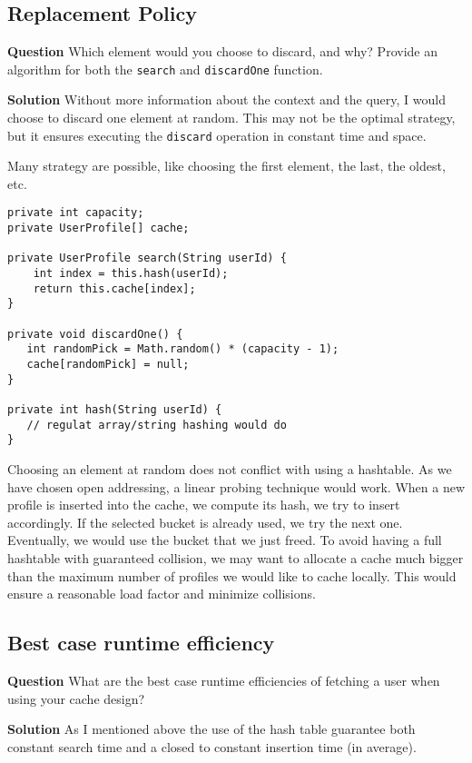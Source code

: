 \documentclass[11pt]{article}
\begin{document}
\subsection{Replacement Policy}
\label{sec:org84741a4}
\textbf{Question} Which element would you choose to discard, and why?
  Provide an algorithm for both the \texttt{search} and \texttt{discardOne}
  function.

\textbf{Solution} Without more information about the context and the
query, I would choose to discard one element at random. This may
not be the optimal strategy, but it ensures executing the \texttt{discard}
operation in constant time and space.

Many strategy are possible, like choosing the first element, the
last, the oldest, etc.

\begin{verbatim}
private int capacity;
private UserProfile[] cache;

private UserProfile search(String userId) {
    int index = this.hash(userId);
    return this.cache[index];
}

private void discardOne() {
   int randomPick = Math.random() * (capacity - 1);  
   cache[randomPick] = null;
}

private int hash(String userId) {
   // regulat array/string hashing would do
}
\end{verbatim}

Choosing an element at random does not conflict with using a
hashtable. As we have chosen open addressing, a linear probing
technique would work. When a new profile is inserted into the
cache, we compute its hash, we try to insert accordingly. If the
selected bucket is already used, we try the next one. Eventually,
we would use the bucket that we just freed. To avoid having a full
hashtable with guaranteed collision, we may want to allocate a
cache much bigger than the maximum number of profiles we would like
to cache locally. This would ensure a reasonable load factor and
minimize collisions.

\subsection{Best case runtime efficiency}
\label{sec:org85dae0f}
\textbf{Question} What are the best case runtime efficiencies of fetching a user
  when using your cache design?

\textbf{Solution} As I mentioned above the use of the hash table guarantee
both constant search time and a closed to constant insertion time
(in average).
\end{document}
